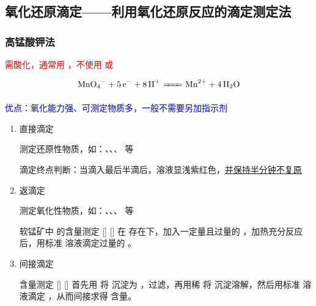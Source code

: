     \subsection[氧化还原滴定]{氧化还原滴定——利用氧化还原反应的滴定测定法}\label{subsec:拓展：氧化还原滴定}

        \subsubsection{高锰酸钾法}\label{subsubsec:高锰酸钾法氧化还原滴定}

            \textcolor{red}{需酸化，通常用 ，不使用  或 }

            \vspace{-0.5\baselineskip}
            \[\cemh{MnO4- + 5 e- + 8H+ \xleq{} Mn^2+ + 4H2O}\]

            \textcolor{blue}{优点：氧化能力强、可测定物质多，一般不需要另加指示剂}

            \begin{enumerate}
                \item 直接滴定
                
                测定还原性物质，如：、、、 等

                滴定终点判断：当滴入最后半滴后，溶液显浅紫红色，\uline{并保持半分钟不复原}

                \item 返滴定
                
                测定氧化性物质，如：、、、 等

                \begin{xmp}
                    {软锰矿中  的含量测定}
                    []
                    []
                    在  存在下，加入一定量且过量的 ，加热充分反应后，用标准  溶液滴定过量的 。
                \end{xmp}

                \item 间接滴定
                
                \begin{xmp}
                    [Ca2+含量测定]
                    { 含量测定}
                    []
                    []
                    首先用  将  沉淀为 ，过滤，再用稀  将  沉淀溶解，然后用标准  溶液滴定 ，从而间接求得  含量。
                \end{xmp}

            \end{enumerate}
            
